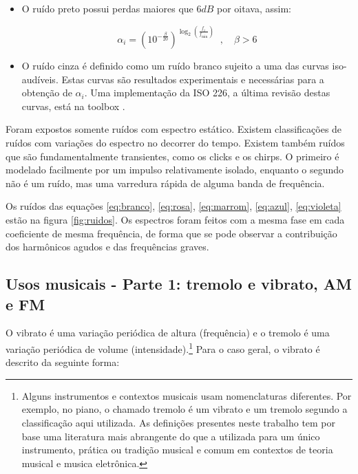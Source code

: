 \begin{itemize}
\item O ruído preto possui perdas maiores que $6dB$ por oitava, assim:

\begin{equation}\label{eq:preto}
\alpha_i=(10^{-\frac{\beta}{20}})^{\log _2 \left( \frac{f_i}{f_{\text{min}}} \right )}\;\;, \quad \beta > 6
\end{equation}



\item O ruído cinza é definido como
um ruído branco sujeito a uma das curvas iso-audíveis. Estas curvas são resultados
experimentais e necessárias para a obtenção de $\alpha_i$. Uma implementação da ISO 226, a última revisão destas curvas, está na toolbox \massa.\cite{MASSA}

\end{itemize}

Foram expostos somente ruídos com espectro estático. Existem classificações
de ruídos com variações do espectro no decorrer do tempo. Existem também ruídos que
são fundamentalmente transientes, como os clicks e os chirps. O primeiro é modelado
facilmente por um impulso relativamente isolado, enquanto o segundo não é um ruído, mas uma varredura rápida de 
alguma banda de frequência.\cite{Cook}

Os ruídos das equações \ref{eq:branco}, \ref{eq:rosa}, \ref{eq:marrom},
\ref{eq:azul}, \ref{eq:violeta} estão na figura \ref{fig:ruidos}. Os espectros foram feitos com a mesma fase em cada coeficiente de mesma frequência, de forma que
se pode observar a contribuição dos harmônicos agudos e
das frequências graves.


\subsection{Usos musicais - Parte 1: tremolo e vibrato, AM e FM}\label{subsec:tvaf}

O vibrato é uma variação periódica de altura (frequência) e 
o tremolo é uma variação periódica de volume (intensidade).\footnote{Alguns instrumentos e contextos musicais usam nomenclaturas diferentes. Por exemplo, no piano, o chamado tremolo é um vibrato e um tremolo segundo a classificação aqui utilizada. As definições presentes neste trabalho tem por base uma literatura mais abrangente do que a utilizada para um único instrumento, prática ou tradição musical e comum em contextos de teoria musical e musica eletrônica.\cite{Lacerda,Harmonia}}
Para o caso geral, o vibrato é descrito da seguinte forma:


